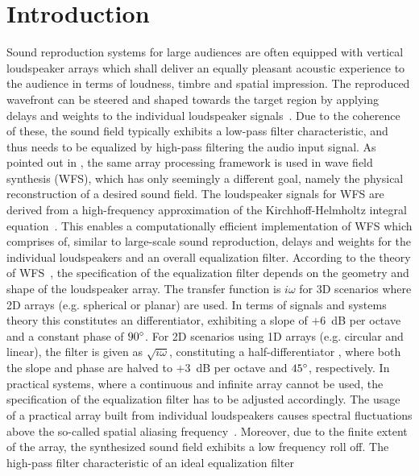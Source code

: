 \section{Introduction}
\label{sec:introduction}
%
Sound reproduction systems for large audiences
are often equipped with vertical loudspeaker arrays
which shall deliver an equally pleasant acoustic experience
to the audience in terms of loudness, timbre and spatial impression.
The reproduced wavefront can be steered and shaped towards the target region
by applying delays and weights to the individual loudspeaker signals~\cite{Meyer1984a, Meyer1990}.
%
Due to the coherence of these,
the sound field typically exhibits a low-pass filter characteristic,
and thus needs to be equalized by high-pass filtering the audio input signal.
As pointed out in \cite[Ch.~3]{schultz2016diss},
the same array processing framework is used in wave field synthesis (WFS),
which has only seemingly a different goal,
namely the physical reconstruction of a desired sound field.
The loudspeaker signals for WFS are derived from
a high-frequency approximation of
the Kirchhoff-Helmholtz integral equation~\cite{spors2008revisited, zotter2013}.
%
This enables a computationally efficient implementation of WFS
which comprises of, similar to large-scale sound reproduction,
delays and weights for the individual loudspeakers
and an overall equalization filter.
%
\NewL According to the theory of WFS~\cite{spors2008revisited},
the specification of the equalization filter
depends on the geometry and shape of the loudspeaker array.
The transfer function is $i\omega$ for 3D scenarios
where 2D arrays (e.g. spherical or planar) are used.
In terms of signals and systems theory this constitutes an differentiator,
exhibiting a slope of $+6$~dB per octave
and a constant phase of $90\degree$.
For 2D scenarios using 1D arrays (e.g. circular and linear),
the filter is given as $\sqrt{i\omega}$, constituting a half-differentiator
\cite{Tseng2000,Krishna2011},
where both the slope and phase are halved to
$+3$~dB per octave and $45\degree$, respectively.
%
\NewL In practical systems, where a continuous and infinite array cannot be used,
the specification of the equalization filter has to be adjusted accordingly.
The usage of a practical array built from individual loudspeakers causes
spectral fluctuations above the so-called spatial aliasing frequency~\cite{spors2008revisited}.
Moreover, due to the finite extent of the array,
the synthesized sound field exhibits a low frequency roll off.
The high-pass filter characteristic of an ideal equalization filter
